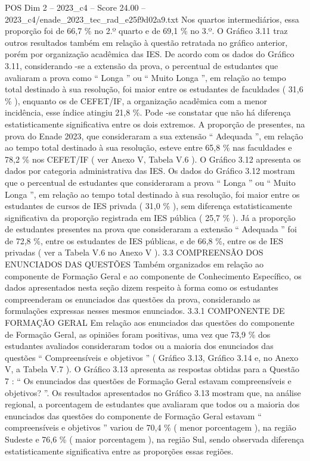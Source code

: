 \begin{textsample}{POS Dim 2 – 2023\_c4 – Score 24.00 – 2023\_c4/enade\_2023\_tec\_rad\_e25f9d02a9.txt}
Nos quartos intermediários, essa proporção foi de 66,7 \% no 2.º quarto e de 69,1 \% no 3.º.
O Gráfico 3.11 traz outros resultados também em relação à questão retratada no gráfico anterior, porém por organização acadêmica das IES.
De acordo com os dados do Gráfico 3.11, considerando -se a extensão da prova, o percentual de estudantes que avaliaram a prova como “ Longa ” ou “ Muito Longa ”, em relação ao tempo total destinado à sua resolução, foi maior entre os estudantes de faculdades ( 31,6 \% ), enquanto os de CEFET/IF, a organização acadêmica com a menor incidência, esse índice atingiu 21,8 \%.
Pode -se constatar que não há diferença estatisticamente significativa entre os dois extremos.
A proporção de presentes, na prova do Enade 2023, que consideraram a sua extensão “ Adequada ”, em relação ao tempo total destinado à sua resolução, esteve entre 65,8 \% nas faculdades e 78,2 \% nos CEFET/IF ( ver Anexo V, Tabela V.6 ).
O Gráfico 3.12 apresenta os dados por categoria administrativa das IES.
Os dados do Gráfico 3.12 mostram que o percentual de estudantes que consideraram a prova “ Longa ” ou “ Muito Longa ”, em relação ao tempo total destinado à sua resolução, foi maior entre os estudantes de cursos de IES privada ( 31,0 \% ), sem diferença estatisticamente significativa da proporção registrada em IES pública ( 25,7 \% ).
Já a proporção de estudantes presentes na prova que consideraram a extensão “ Adequada ” foi de 72,8 \%, entre os estudantes de IES públicas, e de 66,8 \%, entre os de IES privadas ( ver a Tabela V.6 no Anexo V ). 3.3 COMPREENSÃO DOS ENUNCIADOS DAS QUESTÕES Também organizados em relação ao componente de Formação Geral e ao componente de Conhecimento Específico, os dados apresentados nesta seção dizem respeito à forma como os estudantes compreenderam os enunciados das questões da prova, considerando as formulações expressas nesses mesmos enunciados. 3.3.1 COMPONENTE DE FORMAÇÃO GERAL Em relação aos enunciados das questões do componente de Formação Geral, as opiniões foram positivas, uma vez que 73,9 \% dos estudantes avaliados consideraram todos ou a maioria dos enunciados das questões “ Compreensíveis e objetivos ” ( Gráfico 3.13, Gráfico 3.14 e, no Anexo V, a Tabela V.7 ).
O Gráfico 3.13 apresenta as respostas obtidas para a Questão 7 : “ Os enunciados das questões de Formação Geral estavam compreensíveis e objetivos? ”.
Os resultados apresentados no Gráfico 3.13 mostram que, na análise regional, a porcentagem de estudantes que avaliaram que todos ou a maioria dos enunciados das questões do componente de Formação Geral estavam “ compreensíveis e objetivos ” variou de 70,4 \% ( menor porcentagem ), na região Sudeste e 76,6 \% ( maior porcentagem ), na região Sul, sendo observada diferença estatisticamente significativa entre as proporções essas regiões.

\end{textsample}
